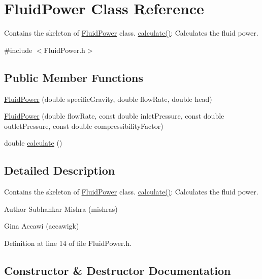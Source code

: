 \hypertarget{class_fluid_power}{}\section{Fluid\+Power Class Reference}
\label{class_fluid_power}


Contains the skeleton of \hyperlink{class_fluid_power}{Fluid\+Power} class. \hyperlink{class_fluid_power_a2691f6efdbd5e71aa91e087c6b1c197b}{calculate()}\+: Calculates the fluid power.  




{\ttfamily \#include $<$Fluid\+Power.\+h$>$}

\subsection*{Public Member Functions}
\begin{DoxyCompactItemize}
\item 
\hyperlink{class_fluid_power_a9bf61af202e27b9e41ed284b4b1643ee}{Fluid\+Power} (double specific\+Gravity, double flow\+Rate, double head)
\item 
\hyperlink{class_fluid_power_a4c0369fcf0c85d28fa9afbdd56358fd4}{Fluid\+Power} (double flow\+Rate, const double inlet\+Pressure, const double outlet\+Pressure, const double compressibility\+Factor)
\item 
double \hyperlink{class_fluid_power_a2691f6efdbd5e71aa91e087c6b1c197b}{calculate} ()
\end{DoxyCompactItemize}


\subsection{Detailed Description}
Contains the skeleton of \hyperlink{class_fluid_power}{Fluid\+Power} class. \hyperlink{class_fluid_power_a2691f6efdbd5e71aa91e087c6b1c197b}{calculate()}\+: Calculates the fluid power. 

\begin{DoxyAuthor}{Author}
Subhankar Mishra (mishras) 

Gina Accawi (accawigk) 
\end{DoxyAuthor}


Definition at line 14 of file Fluid\+Power.\+h.



\subsection{Constructor \& Destructor Documentation}
\mbox{\label{class_fluid_power_a9bf61af202e27b9e41ed284b4b1643ee}} 

